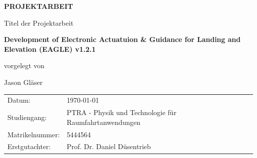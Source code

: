 {%
\pagestyle{empty}
\sffamily

\centering%

\vfill
{\bfseries\Huge PROJEKTARBEIT}

\vfill
Titel der Projektarbeit

{\LARGE\bfseries Development of Electronic Actuatuion \& Guidance for Landing and Elevation (EAGLE) v1.2.1}
\vfill


vorgelegt von

{\Large Jason Gläser}

\vspace{15mm}



\vspace{15mm}

\raggedright
\centering
\begin{tabular}{p{}p{}}
Datum:          & \today \\[1.0ex]
Studiengang:    &  PTRA - Physik und Technologie f\"{u}r Raumfahrtanwendungen\\[1.0ex]
Matrikelnummer: &  5444564\\[1.0ex]
Erstgutachter:  &  Prof. Dr. Daniel D\"{u}sentrieb \\[1.0ex]
\end{tabular}
\cleardoublepage
}%